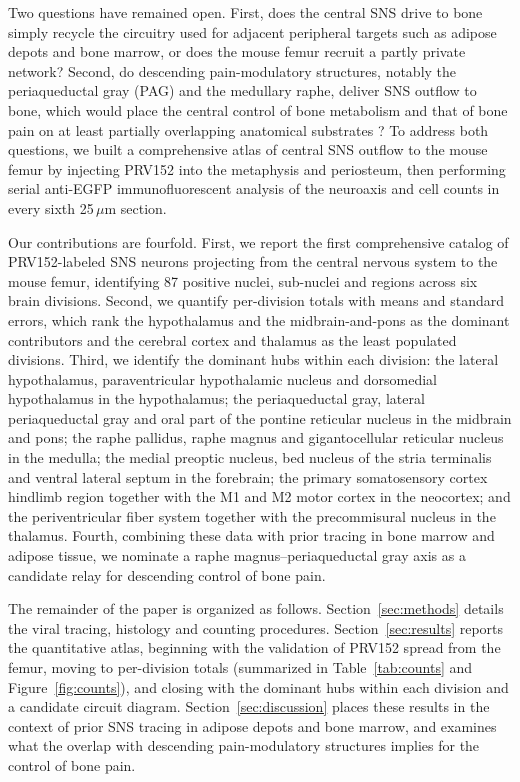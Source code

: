 \documentclass[11pt]{article}
\begin{document}
Two questions have remained open. First, does the central SNS drive to bone simply recycle the circuitry used for adjacent peripheral targets such as adipose depots and bone marrow, or does the mouse femur recruit a partly private network? Second, do descending pain-modulatory structures, notably the periaqueductal gray (PAG) and the medullary raphe, deliver SNS outflow to bone, which would place the central control of bone metabolism and that of bone pain on at least partially overlapping anatomical substrates \citep{francois2017brainstem,heinricher2009descending,benarroch2012postural}? To address both questions, we built a comprehensive atlas of central SNS outflow to the mouse femur by injecting PRV152 into the metaphysis and periosteum, then performing serial anti-EGFP immunofluorescent analysis of the neuroaxis and cell counts in every sixth 25\,$\mu$m section.

Our contributions are fourfold. First, we report the first comprehensive catalog of PRV152-labeled SNS neurons projecting from the central nervous system to the mouse femur, identifying 87 positive nuclei, sub-nuclei and regions across six brain divisions. Second, we quantify per-division totals with means and standard errors, which rank the hypothalamus and the midbrain-and-pons as the dominant contributors and the cerebral cortex and thalamus as the least populated divisions. Third, we identify the dominant hubs within each division: the lateral hypothalamus, paraventricular hypothalamic nucleus and dorsomedial hypothalamus in the hypothalamus; the periaqueductal gray, lateral periaqueductal gray and oral part of the pontine reticular nucleus in the midbrain and pons; the raphe pallidus, raphe magnus and gigantocellular reticular nucleus in the medulla; the medial preoptic nucleus, bed nucleus of the stria terminalis and ventral lateral septum in the forebrain; the primary somatosensory cortex hindlimb region together with the M1 and M2 motor cortex in the neocortex; and the periventricular fiber system together with the precommisural nucleus in the thalamus. Fourth, combining these data with prior tracing in bone marrow and adipose tissue, we nominate a raphe magnus--periaqueductal gray axis as a candidate relay for descending control of bone pain.

The remainder of the paper is organized as follows. Section~\ref{sec:methods} details the viral tracing, histology and counting procedures. Section~\ref{sec:results} reports the quantitative atlas, beginning with the validation of PRV152 spread from the femur, moving to per-division totals (summarized in Table~\ref{tab:counts} and Figure~\ref{fig:counts}), and closing with the dominant hubs within each division and a candidate circuit diagram. Section~\ref{sec:discussion} places these results in the context of prior SNS tracing in adipose depots and bone marrow, and examines what the overlap with descending pain-modulatory structures implies for the control of bone pain.
\end{document}

